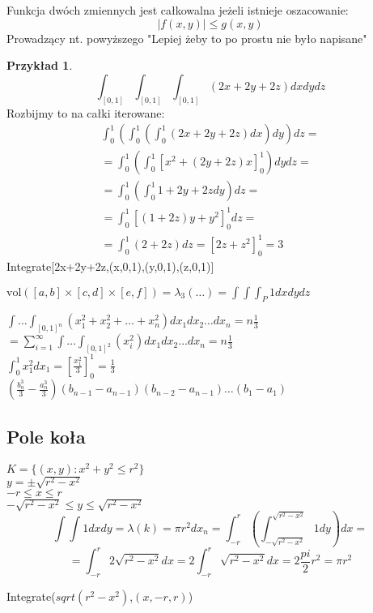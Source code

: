 \documentclass{article}
\theoremstyle{definition}
\theoremstyle{definition}
\theoremstyle{definition}
\newtheorem{pk}{Przykład}[subsection]
\theoremstyle{definition}
\theoremstyle{definition}
\theoremstyle{definition}
\theoremstyle{definition}
\begin{document}
Funkcja dwóch zmiennych jest całkowalna jeżeli istnieje oszacowanie:
\[|f(x,y)| \leq g(x,y)\]
Prowadzący nt. powyższego "Lepiej żeby to po prostu nie było napisane"

\begin{pk}
    \[\int_{[0,1]} \int_{[0,1]} \int_{[0,1]} (2x+2y+2z) dx dy dz\]
    Rozbijmy to na całki iterowane:
    \begin{align}
        \int_0^1 \left( \int_0^1 \left( \int_0^1 (2x+2y+2z) dx \right) dy \right) dz =\\
        =\int_0^1 \left( \int_0^1 \left[x^2 + (2y+2z)x\right]_0^1 \right) dy dz= \\
        =\int_0^1 \left( \int_0^1 1+2y+2z dy \right) dz=\\
        =\int_0^1 \left[(1+2z)y + y^2\right]_0^1 dz=\\
        =\int_0^1 (2+2z) dz = \left[2z+z^2\right]_0^1 = 3
    \end{align}
    Integrate[2x+2y+2z,(x,0,1),(y,0,1),(z,0,1)]
\end{pk}
$\text{vol}([a,b]\times[c,d]\times[e,f]) = \lambda_3(\dots) = \int\int\int_P 1 dx dy dz$

$\int \dots \int_{[0,1]^n} (x_1^2 + x_2^2 + \dots + x_n^2) dx_1dx_2 \dots dx_n = n \frac{1}{3}$\\
$=\sum_{i=1}^{\infty} \int \dots \int_{[0,1]^2} (x_i^2) dx_1 dx_2 \dots dx_n = n \frac{1}{3}$\\
$\int_0^1 x_1^2 dx_1 = \left[\frac{x_1^2}{3}\right]_0^1 = \frac{1}{3}$\\
$(\frac{b_n^3}{3} - \frac{a_n^3}{3})(b_{n-1} - a_{n-1})(b_{n-2} - a_{n-1})\dots(b_1-a_1)$\\

\subsection{Pole koła}

$K=\{(x,y): x^2 + y^2 \leq r^2\}$\\
$y=\pm\sqrt{r^2-x^2}$\\
$-r \leq x \leq r$\\
$-\sqrt{r^2-x^2} \leq y \leq \sqrt{r^2-x^2}$
\[\int \int 1 dx dy = \lambda(k) = \pi r^2 dx_n = \int_{-r}^{r} \left(\int_{-\sqrt{r^2-x^2}}^{\sqrt{r^2-x^2}} 1 dy \right) dx =\]
\[=\int_{-r}^{r} 2\sqrt{r^2-x^2} dx = 2 \int_{-r}^{r} \sqrt{r^2-x^2} dx = 2 \frac{pi}{2} r^2 = \pi r^2\]

Integrate($sqrt(r^2-x^2)$,$(x,-r,r)$)\\
\end{document}
